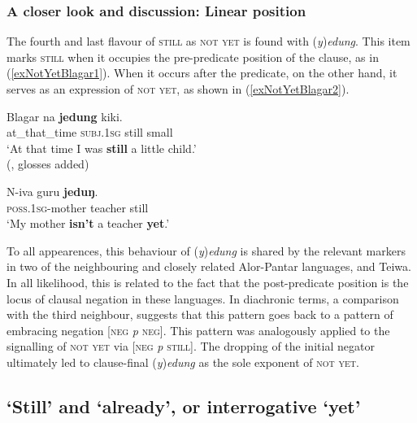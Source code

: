 \subsubsection{A closer look and discussion: Linear position} 
The fourth and last flavour of \textsc{still} as \textsc{not yet} is found with  \mbox{(\textit{y})\textit{edung}}. This item marks \textsc{still} when it occupies the pre-predicate position of the clause, as in (\ref{exNotYetBlagar1}). When it occurs after the predicate, on the other hand, it serves as an expression of \textsc{not yet}, as shown in (\ref{exNotYetBlagar2}).
\begin{exe}
	\ex\label{exNotYetBlagar}
	\begin{xlist}
		\exi{}Blagar
		\ex\label{exNotYetBlagar1}
		 na \textbf{jedung} kiki.\\
		at\_that\_time \textsc{subj}.1\textsc{sg} still small\\
		\glt \lq At that time I was \textbf{still} a little child.'
		\\(\cite[195]{SteinhauerGomang2016}, glosses added)

	\ex\label{exNotYetBlagar2}
	\gll N-iva guru \textbf{jeduŋ}.\\ 
	\textsc{poss}.1\textsc{sg}-mother teacher still\\
	\glt \lq My mother \textbf{isn’t} a teacher \textbf{yet}.' \parencite[165]{SteinhauerBlagar}
	\end{xlist}
\end{exe}

To all appearences, this behaviour of \mbox{(\textit{y})\textit{edung}} is shared by the relevant markers in two of the neighbouring and closely related Alor-Pantar languages,  and Teiwa. In all likelihood, this is related to the fact that the post-predicate position is the locus of clausal negation in these languages. In diachronic terms, a comparison with the third neighbour,  \parencite{Willemsen2020} suggests that this pattern goes back to a pattern of embracing negation [\textsc{neg} \textit{p} \textsc{neg}]. This pattern was analogously applied to the signalling of \textsc{not yet} via [\textsc{neg} \textit{p} \textsc{still}]. The dropping of the initial negator ultimately led to clause-final \mbox{(\textit{y})\textit{edung}} as the sole exponent of \textsc{not yet}.

\subsection{\lq{}Still\rq{ }and \lq{}already\rq{}, or interrogative \lq yet\rq{}}\label{sectionAlready}\label{sectionInterrogativeYet}
